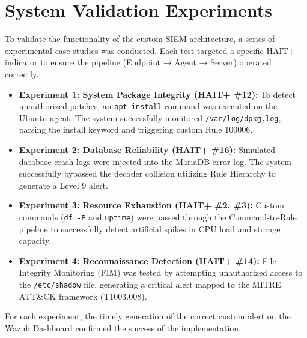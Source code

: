 \section{System Validation Experiments}
\label{sec:evaluationPlan}
To validate the functionality of the custom SIEM architecture, a series of experimental case studies was conducted. Each test targeted a specific HAIT+ indicator to ensure the pipeline (Endpoint → Agent → Server) operated correctly.

\begin{itemize}
\item \textbf{Experiment 1: System Package Integrity (HAIT+ \#12):} To detect unauthorized patches, an \texttt{apt install} command was executed on the Ubuntu agent. The system successfully monitored \texttt{/var/log/dpkg.log}, parsing the install keyword and triggering custom Rule 100006.
\item \textbf{Experiment 2: Database Reliability (HAIT+ \#16):} Simulated database crash logs were injected into the MariaDB error log. The system successfully bypassed the decoder collision utilizing Rule Hierarchy to generate a Level 9 alert.
\item \textbf{Experiment 3: Resource Exhaustion (HAIT+ \#2, \#3):} Custom commands (\texttt{df -P} and \texttt{uptime}) were passed through the Command-to-Rule pipeline to successfully detect artificial spikes in CPU load and storage capacity.
\item \textbf{Experiment 4: Reconnaissance Detection (HAIT+ \#14):} File
Integrity Monitoring (FIM) was tested by attempting unauthorized access to
the \texttt{/etc/shadow} file, generating a critical alert mapped to the
MITRE ATT\&CK framework \cite{mitre_attack} (T1003.008).
\end{itemize}
For each experiment, the timely generation of the correct custom alert on the Wazuh Dashboard confirmed the success of the implementation.



  